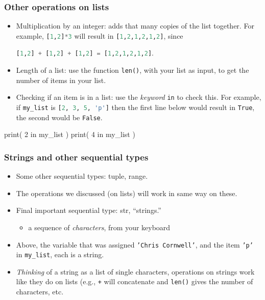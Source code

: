\documentclass{beamer}
\newenvironment{codeblock}
    {\hfill\begin{beamerboxesrounded}[lower=codecol, width=0.8\textwidth]
    \medskip

    }
    { 
    \end{beamerboxesrounded}\hfill
    }
\theoremstyle{example}
\newcommand{\ct}[1]{\lstinline[language=Python]!#1!}
\newcommand{\ttt}[1]{{\small\texttt{#1}}}
\begin{document}
\begin{frame}[fragile]
\frametitle{Other operations on lists}

\begin{itemize}
	\item Multiplication by an integer: adds that many copies of the list together. For example, \ct{[1,2]*3} will result in \ct{[1,2,1,2,1,2]}, since 
	\begin{center}\ct{[1,2] + [1,2] + [1,2] = [1,2,1,2,1,2]}.
	\end{center}
	\item Length of a list: use the function \ttt{len()}, with your list as input, to get the number of items in your list.
	\item Checking if an item is in a list: use the \emph{keyword} \ttt{in} to check this. For example, if \ttt{my}\ct{_}\ttt{list} is \ct{[2, 3, 5, 'p']} then the first line below would result in \ttt{True}, the second would be \ttt{False}.
\end{itemize}

\begin{codeblock}

\begin{python}
print( 2 in my_list )
print( 4 in my_list )
\end{python}

\end{codeblock}

\end{frame}

\begin{frame}
\frametitle{Strings and other sequential types}

\begin{itemize}
	\item Some other sequential types: {\ttb tuple}, {\ttb range}.
	\item The operations we discussed (on lists) will work in same way on these.

	\item Final important sequential type: {\ttb str}, ``strings.''
	\begin{itemize}
		\item a sequence of \emph{characters}, from your keyboard
	\end{itemize}
	\item Above, the variable that was assigned \ttt{'Chris Cornwell'}, and the item \ttt{'p'} in \ttt{my}\ct{_}\ttt{list}, each is a string.
	\item \emph{Thinking} of a string as a list of single characters, operations on strings work like they do on lists (e.g., \ttt{+} will concatenate and \ttt{len()} gives the number of characters, etc. 
\end{itemize}
\end{frame}
\end{document}
